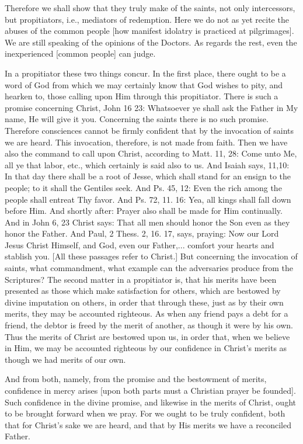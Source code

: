 Therefore we shall show that they truly make of the saints, not only
intercessors, but propitiators, i.e., mediators of redemption.  Here
we do not as yet recite the abuses of the common people [how manifest
idolatry is practiced at pilgrimages].  We are still speaking of the
opinions of the Doctors.  As regards the rest, even the inexperienced
[common people] can judge.

In a propitiator these two things concur.  In the first place, there
ought to be a word of God from which we may certainly know that God
wishes to pity, and hearken to, those calling upon Him through this
propitiator.  There is such a promise concerning Christ, John 16 23:
Whatsoever ye shall ask the Father in My name, He will give it you.
Concerning the saints there is no such promise.  Therefore
consciences cannot be firmly confident that by the invocation of
saints we are heard.  This invocation, therefore, is not made from
faith.  Then we have also the command to call upon Christ, according
to Matt. 11, 28: Come unto Me, all ye that labor, etc., which
certainly is said also to us.  And Isaiah says, 11,10: In that day
there shall be a root of Jesse, which shall stand for an ensign to
the people; to it shall the Gentiles seek.  And Ps. 45, 12: Even the
rich among the people shall entreat Thy favor.  And Ps. 72, 11. 16:
Yea, all kings shall fall down before Him.  And shortly after: Prayer
also shall be made for Him continually.  And in John 6, 23 Christ
says: That all men should honor the Son even as they honor the Father.
And Paul, 2 Thess. 2, 16. 17, says, praying: Now our Lord Jesus
Christ Himself, and God, even our Father,... comfort your hearts and
stablish you.  [All these passages refer to Christ.] But concerning
the invocation of saints, what commandment, what example can the
adversaries produce from the Scriptures?  The second matter in a
propitiator is, that his merits have been presented as those which
make satisfaction for others, which are bestowed by divine imputation
on others, in order that through these, just as by their own merits,
they may be accounted righteous.  As when any friend pays a debt for
a friend, the debtor is freed by the merit of another, as though it
were by his own.  Thus the merits of Christ are bestowed upon us, in
order that, when we believe in Him, we may be accounted righteous by
our confidence in Christ's merits as though we had merits of our own.

And from both, namely, from the promise and the bestowment of merits,
confidence in mercy arises [upon both parts must a Christian prayer
be founded].  Such confidence in the divine promise, and likewise in
the merits of Christ, ought to be brought forward when we pray.  For
we ought to be truly confident, both that for Christ's sake we are
heard, and that by His merits we have a reconciled Father.

